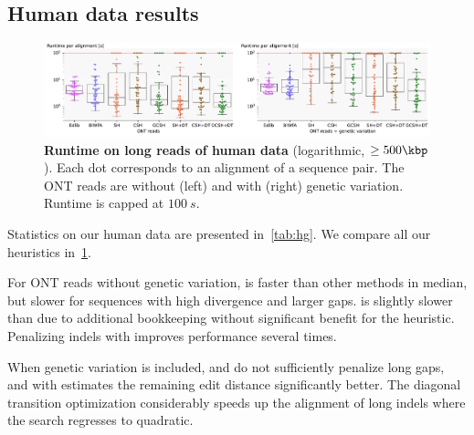 \subsection{Human data results}\label{app:human}



\begin{figure}[t]
  \centering
  \includegraphics[scale=0.55]{plots/real_full.pdf}%
  \caption{\textbf{Runtime on long reads of human data} (logarithmic, $\geq
    500\kbp$). Each dot corresponds to an alignment of a sequence pair. The ONT reads
    are without (left) and with (right) genetic variation. Runtime is
    capped at $\qty{100}{s}$.}
  \label{fig:human-full}
\end{figure}

Statistics on our human data are presented in~\cref{tab:hg}. We compare all our
heuristics in~\cref{fig:human-full}.

For ONT reads without genetic variation, \SH is faster than other methods in
median, but slower for sequences with high divergence and larger gaps.
\CSH is slightly slower than \SH due to additional bookkeeping without
significant benefit for the heuristic. Penalizing indels with \GCH improves
performance several times.

When genetic variation is included, \SH and \CSH do not sufficiently penalize
long gaps, and \A with \GCH estimates the remaining edit distance significantly
better. The diagonal transition optimization considerably speeds up the
alignment of long indels where the search regresses to quadratic.
